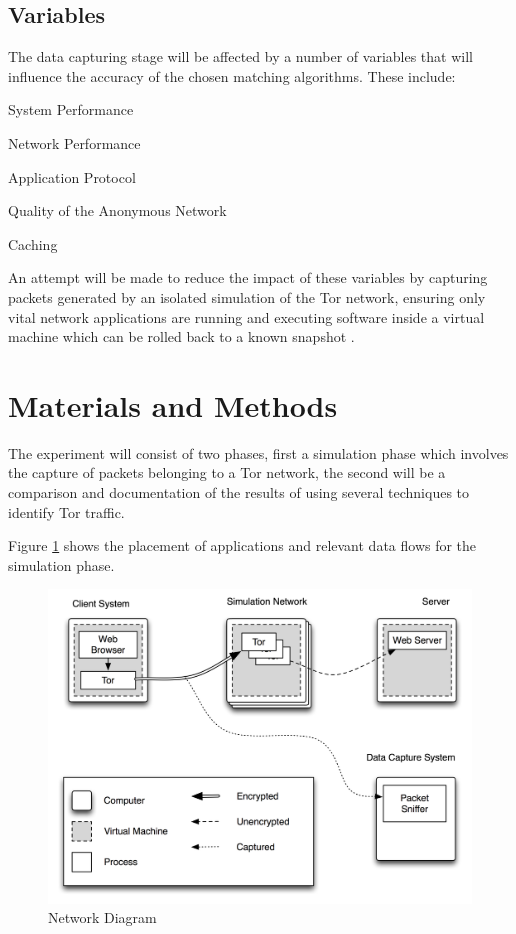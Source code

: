 \documentclass{conference}
\begin{document}
\subsection{Variables}

The data capturing stage will be affected by a number of variables that will influence the accuracy of the chosen matching algorithms. These include:

\begin{enumerate*}
\item System Performance
\item Network Performance
\item Application Protocol
\item Quality of the Anonymous Network
\item Caching
\end{enumerate*}

An attempt will be made to reduce the impact of these variables by capturing packets generated by an isolated simulation of the Tor network, ensuring only vital network applications are running and executing software inside a virtual machine which can be rolled back to a known snapshot \citep{website:snapshot-definition}.

\section{Materials and Methods}

The experiment will consist of two phases, first a simulation phase which involves the capture of packets belonging to a Tor network, the second will be a comparison and documentation of the results of using several techniques to identify Tor traffic.

Figure \ref{network-diagram} shows the placement of applications and relevant data flows for the simulation phase.

\begin{figure}
\center \includegraphics[scale=0.7]{network-diagram}
\caption{Network Diagram}
\label{network-diagram}
\end{figure}

\printbibliography[title=REFERENCES]
\end{document}

